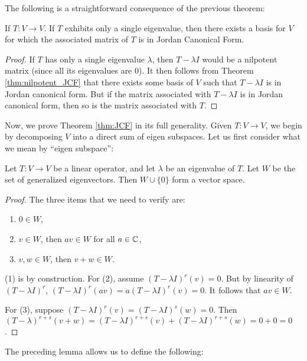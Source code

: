 The following is a straightforward consequence of the previous
theorem:

\begin{cor}\label{cor:single_eigenvalue_JCF}
If $T: V \to V$. If $T$ exhibits only a single eigenvalue, then
there exists a basis for $V$ for which the associated matrix of
$T$ is in Jordan Canonical Form.
\end{cor}
\begin{proof}
If $T$ has only a single eigenvalue $\lambda$, then $T - \lambda I$
would be a nilpotent matrix (since all its eigenvalues are 0). It 
then follows from Theorem \ref{thm:nilpotent_JCF} that there exists 
some basis of $V$ such that $T - \lambda I$ is in Jordan canonical form.
But if the matrix associated with $T - \lambda I$ is in Jordan canonical
form, then so is the matrix associated with $T$.
\end{proof}

Now, we prove Theorem \ref{thm:JCF} in its full generality. Given 
$T: V \to V$, we begin by decomposing $V$ into a direct sum of 
eigen subspaces. Let us first consider what we mean by ``eigen subspace'':

\begin{lem}
Let $T: V \to V$ be a linear operator, and let $\lambda$ be an eigenvalue
of $T$. Let $W$ be the set of generalized eigenvectors. Then $W 
\cup \{0\}$ form a vector space.
\end{lem}
\begin{proof}
The three items that we need to verify are:
\begin{enumerate}
\item $0 \in W$,

\item $v \in W$, then $av \in W$ for all $a \in \mathbb{C}$,

\item $v, w \in W$, then $v + w \in W$.
\end{enumerate}

(1) is by construction. For (2), assume $(T - \lambda I)^r(v) = 0$.
But by linearity of $(T - \lambda I)^r$, $(T - \lambda I)^r(av) =
a(T - \lambda I)^r(v) = 0$. It follows that $av \in W$.

For (3), suppose $(T - \lambda I)^r(v) = (T - \lambda I)^s(w) = 0$.
Then $(T - \lambda)^{r + s}(v + w) = (T - \lambda I)^{r + s}(v) +
(T - \lambda I)^{r + s}(w) = 0 + 0 = 0$.
\end{proof}

The preceding lemma allows us to define the following:

